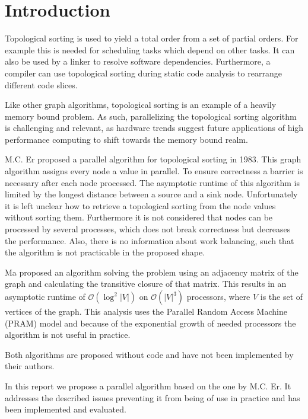 \section{Introduction}\label{sec:intro}

Topological sorting is used to yield a total order from a set of partial orders. For example this is needed for scheduling tasks which depend on other tasks. It can also be used by a linker to resolve software dependencies. Furthermore, a compiler can use topological sorting during static code analysis to rearrange different code slices.

Like other graph algorithms, topological sorting is an example of a heavily memory bound problem. As such, parallelizing the topological sorting algorithm is challenging and relevant, as hardware trends suggest future applications of high performance computing to shift towards the memory bound realm.


M.C. Er \cite{er1983parallel} proposed a parallel algorithm for topological sorting in 1983. This graph algorithm assigns every node a value in parallel. To ensure correctness a barrier is necessary after each node processed. The asymptotic runtime of this algorithm is limited by the longest distance between a source and a sink node. Unfortunately it is left unclear how to retrieve a topological sorting from the node values without sorting them. Furthermore it is not considered that nodes can be processed by several processes, which does not break correctness but decreases the performance. Also, there is no information about work balancing, such that the algorithm is not practicable in the proposed shape.

Ma \cite{ma1997efficient} proposed an algorithm solving the problem using an adjacency matrix of the graph and calculating the transitive closure of that matrix. This results in an asymptotic runtime  of $\mathcal{O}(\log^2 |V|)$ on $\mathcal{O}(|V|^3)$ processors, where $V$ is the set of vertices of the graph. This analysis uses the Parallel Random Access Machine (PRAM) model and because of the exponential growth of needed processors the algorithm is not useful in practice.

Both algorithms are proposed without code and have not been implemented by their authors.

In this report we propose a parallel algorithm based on the one by M.C. Er. It addresses the described issues preventing it from being of use in practice and has been implemented and evaluated.


